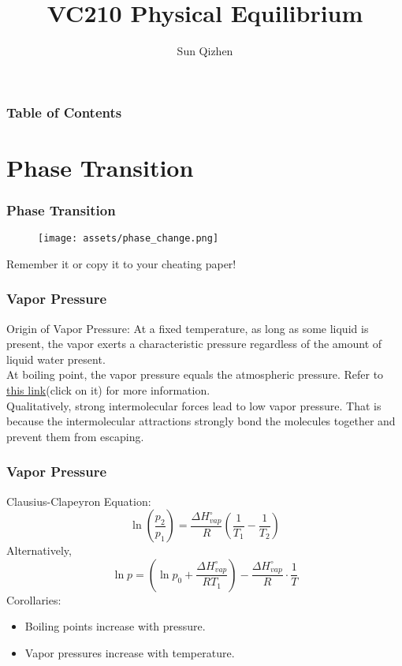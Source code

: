 \documentclass[aspectratio=169]{beamer}
\title[Course number]{VC210 Physical Equilibrium}
\author[]{Sun Qizhen}
\institute[UMJI-SJTU]
{
	University of Michigan - Shanghai Jiaotong University
	\\\medskip
	Joint Institute
}
\def\blankline{\\[6pt]}
\begin{document}
\maketitle
\begin{frame}
  \frametitle{Table of Contents}
  \tableofcontents
\end{frame}


\section{Phase Transition}
\begin{frame}
  \frametitle{Phase Transition}
  \begin{figure}
    \centering
    \texttt{[image: assets/phase\_change.png]}
  \end{figure}
  Remember it or copy it to your cheating paper!
\end{frame}
\begin{frame}
  \frametitle{Vapor Pressure}
  Origin of Vapor Pressure: At a fixed temperature, as long as some liquid is present, 
  the vapor exerts a characteristic pressure regardless of the amount of liquid water present.
  \blankline
  At boiling point, the vapor pressure equals the atmospheric pressure. Refer to \href{https://zhuanlan.zhihu.com/p/33133532}{this link}(click on it) 
  for more information.
  \blankline
  Qualitatively, strong intermolecular forces lead to low vapor pressure. That is because the intermolecular
  attractions strongly bond the molecules together and prevent them from escaping.

\end{frame}
\begin{frame}
  \frametitle{Vapor Pressure}
  Clausius-Clapeyron Equation:
  \begin{equation*}
    \ln(\frac{p_2}{p_1}) = \frac{\Delta H_{vap}^{\circ}}{R}\left(\frac{1}{T_1} - \frac{1}{T_2}\right)
  \end{equation*}
  Alternatively, 
  \begin{equation*}
    \ln p = \left(\ln p_0 + \frac{\Delta H_{vap}^{\circ}}{RT_1}\right) - \frac{\Delta H_{vap}^{\circ}}{R}\cdot \frac{1}{T}
  \end{equation*} 
  Corollaries:
  \begin{itemize}
    \item Boiling points increase with pressure.
    \item Vapor pressures increase with temperature.
  \end{itemize}
\end{frame}
\end{document}
